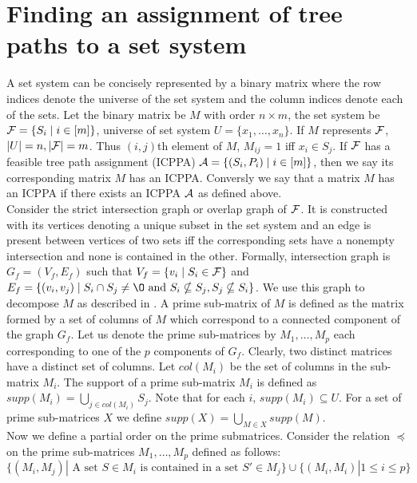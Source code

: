 \documentclass{llncs}
\def\cA{{\cal A}}
\def\cF{{\cal F}}
\begin{document}
\section{Finding an assignment of tree paths to a set system}
A set system can be concisely represented by a binary matrix where the
row indices denote the universe of the set system and the column
indices denote each of the sets. Let the binary matrix be $M$ with
order $n \times m$, the set system be $\cF = \{S_i \mid i \in [m]\}$,
universe of set system $U = \{x_1, \dots ,x_n\}$. If $M$ represents $\cF$, $|U| = n, |\cF| =
m$. Thus $(i,j)$th element of $M$, $M_{ij} = 1$ iff $x_i \in S_j$. If $\cF$ has a feasible tree path assignment (ICPPA) $\cA =
\{(S_i,P_i) \mid i \in [m]\}$, then we
say its corresponding matrix $M$ has an ICPPA. Conversly
we say that a matrix $M$ has an ICPPA if there exists an ICPPA $\cA$ as defined
above.\\
\noindent
Consider the strict intersection graph or overlap graph of $\cF$. It
is constructed with its vertices denoting a unique subset in the set
system and an edge is present between vertices of two sets iff the
corresponding sets have a nonempty intersection and none is contained
in the other. Formally, intersection graph is $G_f = (V_f, E_f)$ such
that $V_f = \{v_i \mid S_i \in \cF\}$ and $E_f = \{(v_i, v_j) \mid S_i
\cap S_j \ne \O \text{ and }S_i \nsubseteq S_j, S_j \nsubseteq S_i
\}$.  We use this graph to decompose $M$ as described in \cite{wlh02,nsnrs09}.  
A prime sub-matrix of $M$ is defined as the
matrix formed by a set of columns of $M$ which correspond to a
connected component of the graph $G_f$.  Let us denote the prime
sub-matrices by $M_1,\ldots,M_p$ each corresponding to one of the $p$
components of $G_f$. Clearly, two distinct matrices have
a distinct set of columns.  Let $col(M_i)$ be the set of columns in
the sub-matrix $M_i$.  The support
of a prime sub-matrix $M_i$ is defined as $supp(M_i) = \displaystyle \bigcup_{j \in
  col(M_i)}S_j$. Note that for each $i$, $supp(M_i) \subseteq
U$.  For a set of prime sub-matrices $X$ we define
$supp(X) = \displaystyle \bigcup_{M \in X} supp(M)$. \\


\noindent
Now we define a partial order on the prime submatrices. Consider the relation
$\preccurlyeq$ on the prime sub-matrices $M_1, \ldots, M_p$ defined as
follows: 
\begin{equation} 
\nonumber \{(M_i,M_j) | \mbox{ A set } S \in
  M_i \mbox{ is contained in a set } S' \in M_j\} \cup \{(M_i,M_i) | 1
  \leq i \leq p\} 
\end{equation}
\end{document}
